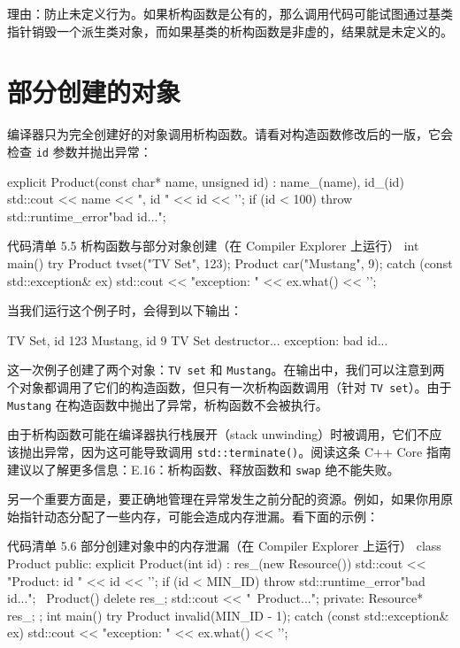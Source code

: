 \begin{myQuote}
理由：防止未定义行为。如果析构函数是公有的，那么调用代码可能试图通过基类指针销毁一个派生类对象，而如果基类的析构函数是非虚的，结果就是未定义的。
\end{myQuote}

\section{部分创建的对象}

编译器只为完全创建好的对象调用析构函数。请看对构造函数修改后的一版，它会检查 \texttt{id} 参数并抛出异常：

\begin{codebox}[cpp]
explicit Product(const char* name, unsigned id) : name_(name), id_(id) {
std::cout << name << ", id " << id << '\n';
if (id < 100)
throw std::runtime_error{"bad id..."};
}
\end{codebox}

\begin{codeboxt}[cpp]{代码清单 5.5 析构函数与部分对象创建（在 Compiler Explorer 上运行）}
int main() {
try {
Product tvset("TV Set", 123);
Product car("Mustang", 9);
}
catch (const std::exception& ex) {
std::cout << "exception: " << ex.what() << '\n';
}
}
\end{codeboxt}

当我们运行这个例子时，会得到以下输出：

\begin{codebox}[cpp]
TV Set, id 123
Mustang, id 9
TV Set destructor...
exception: bad id...
\end{codebox}

这一次例子创建了两个对象：\texttt{TV set} 和 \texttt{Mustang}。在输出中，我们可以注意到两个对象都调用了它们的构造函数，但只有一次析构函数调用（针对 \texttt{TV set}）。由于 \texttt{Mustang} 在构造函数中抛出了异常，析构函数不会被执行。

\begin{myWarnBox}
由于析构函数可能在编译器执行栈展开（stack unwinding）时被调用，它们不应该抛出异常，因为这可能导致调用 \texttt{std::terminate()}。阅读这条 C++ Core 指南建议以了解更多信息：E.16：析构函数、释放函数和 \texttt{swap} 绝不能失败。
\end{myWarnBox}

另一个重要方面是，要正确地管理在异常发生之前分配的资源。例如，如果你用原始指针动态分配了一些内存，可能会造成内存泄漏。看下面的示例：


\begin{codeboxt}[cpp]{代码清单 5.6 部分创建对象中的内存泄漏（在 Compiler Explorer 上运行）}
class Product {
public:
explicit Product(int id) : res_(new Resource()) {
std::cout << "Product: id " << id << '\n';
if (id < MIN_ID)
throw std::runtime_error{"bad id..."};
}
~Product() {
delete res_;
std::cout <<
"~Product...\n";
}
private:
Resource* res_;
};
int main() {
try {
Product invalid(MIN_ID - 1);
}
catch (const std::exception& ex) {
std::cout << "exception: " << ex.what() << '\n';
}
}
\end{codeboxt}


